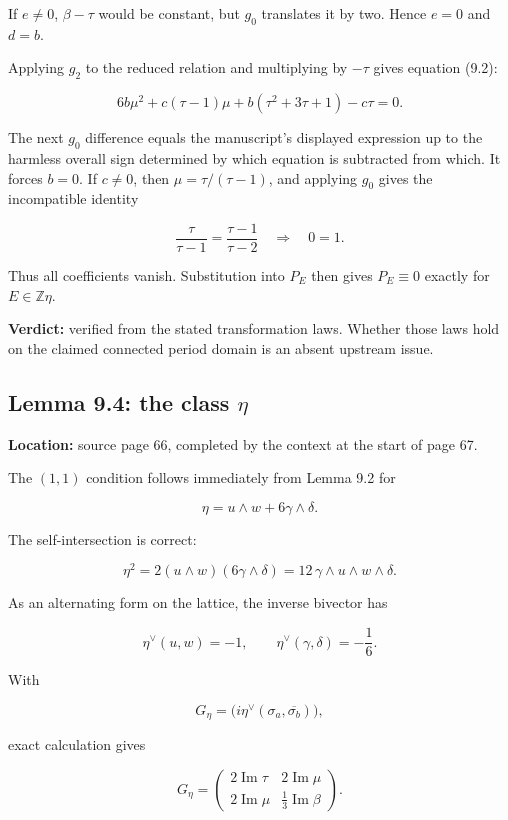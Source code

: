\documentclass[
  10pt,
]{article}
\begin{document}
If \(e\ne0\), \(\beta-\tau\) would be constant, but \(g_0\) translates
it by two. Hence \(e=0\) and \(d=b\).

Applying \(g_2\) to the reduced relation and multiplying by \(-\tau\)
gives equation (9.2):

\[
6b\mu^2+c(\tau-1)\mu+b(\tau^2+3\tau+1)-c\tau=0.
\]

The next \(g_0\) difference equals the manuscript's displayed expression
up to the harmless overall sign determined by which equation is
subtracted from which. It forces \(b=0\). If \(c\ne0\), then
\(\mu=\tau/(\tau-1)\), and applying \(g_0\) gives the incompatible
identity

\[
\frac{\tau}{\tau-1}=\frac{\tau-1}{\tau-2}
\quad\Longrightarrow\quad 0=1.
\]

Thus all coefficients vanish. Substitution into \(P_E\) then gives
\(P_E\equiv0\) exactly for \(E\in\mathbb Z\eta\).

\textbf{Verdict:} verified from the stated transformation laws. Whether
those laws hold on the claimed connected period domain is an absent
upstream issue.

\subsection{\texorpdfstring{Lemma 9.4: the class
\(\eta\)}{Lemma 9.4: the class \textbackslash eta}}\label{lemma-9.4-the-class-eta}

\textbf{Location:} source page 66, completed by the context at the start
of page 67.

The \((1,1)\) condition follows immediately from Lemma 9.2 for

\[
\eta=u\wedge w+6\gamma\wedge\delta.
\]

The self-intersection is correct:

\[
\eta^2
=2(u\wedge w)(6\gamma\wedge\delta)
=12\,\gamma\wedge u\wedge w\wedge\delta.
\]

As an alternating form on the lattice, the inverse bivector has

\[
\eta^\vee(u,w)=-1,
\qquad
\eta^\vee(\gamma,\delta)=-\frac16.
\]

With

\[
G_\eta=\bigl(i\eta^\vee(\sigma_a,\overline{\sigma_b})\bigr),
\]

exact calculation gives

\[
G_\eta=
\begin{pmatrix}
2\operatorname{Im}\tau&2\operatorname{Im}\mu\\
2\operatorname{Im}\mu&\frac13\operatorname{Im}\beta
\end{pmatrix}.
\]
\end{document}
